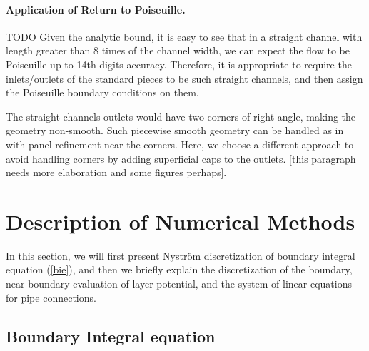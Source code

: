 \documentclass[10pt,twocolumn]{article}
\begin{document}
\paragraph*{Application of Return to Poiseuille.}
TODO
Given the analytic bound, it is easy to see
that in a straight channel with length greater than 8 times of the channel width, we can expect the 
flow to be Poiseuille up to 14th digits accuracy. Therefore, it is appropriate to require the inlets/outlets of
the standard pieces to be such straight channels, and then assign the Poiseuille boundary conditions on them. 

The straight channels outlets would have two corners of right angle, making the geometry non-smooth. Such piecewise 
smooth geometry can be handled as in \cite{wuSolutionStokesFlow2020} with panel refinement near the corners. 
Here, we choose a different approach to avoid handling corners by adding superficial caps to the outlets. 
[this paragraph needs more elaboration and some figures perhaps]. 


\section{Description of Numerical Methods\label{sec:numericalmethod}}
In this section, we will first present Nystr\"om discretization of boundary integral equation (\ref{bie}), 
and then we briefly explain the discretization of the boundary, near boundary evaluation of layer potential, 
and the system of linear equations for pipe connections.  

\subsection{Boundary Integral equation}
\end{document}
